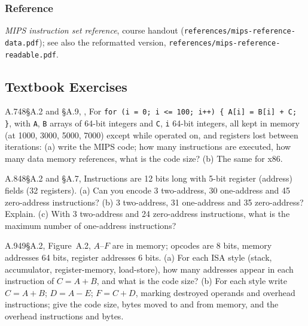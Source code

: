 \subsubsection{Reference}
\emph{MIPS instruction set reference}, course handout
(\texttt{references/mips-reference-data.pdf}); see also the reformatted
version, \texttt{references/mips-reference-readable.pdf}.

\subsection{Textbook Exercises}
\label{sec:isa-tbx}

\begin{tbexercise}[A]{A.7}{48}{\S A.2 and \S A.9, , }
For \texttt{for (i = 0; i <= 100; i++) \{ A[i] = B[i] + C; \}}, with \texttt{A},
\texttt{B} arrays of 64-bit integers and \texttt{C}, \texttt{i} 64-bit integers, all
kept in memory (at 1000, 3000, 5000, 7000) except while operated on, and registers
lost between iterations: (a) write the MIPS code; how many instructions are executed,
how many data memory references, what is the code size? (b) The same for x86.
\end{tbexercise}

\begin{tbexercise}[A]{A.8}{48}{\S A.2 and \S A.7, }
Instructions are 12 bits long with 5-bit register (address) fields (32 registers).
(a) Can you encode 3 two-address, 30 one-address and 45 zero-address instructions?
(b) 3 two-address, 31 one-address and 35 zero-address? Explain. (c) With 3 two-address
and 24 zero-address instructions, what is the maximum number of one-address
instructions?
\end{tbexercise}

\begin{tbexercise}[A]{A.9}{49}{\S A.2, Figure~A.2, }
$A$--$F$ are in memory; opcodes are 8 bits, memory addresses 64 bits, register
addresses 6 bits. (a) For each ISA style (stack, accumulator, register-memory,
load-store), how many addresses appear in each instruction of $C=A+B$, and what is the
code size? (b) For each style write $C=A+B$; $D=A-E$; $F=C+D$, marking destroyed
operands and overhead instructions; give the code size, bytes moved to and from
memory, and the overhead instructions and bytes.
\end{tbexercise}

